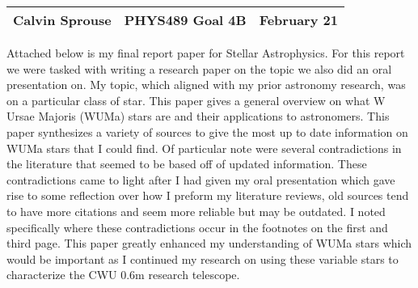 \documentclass[a4paper, 12pt]{config/homework}
\begin{document}
\noindent
\begin{tabularx}{\textwidth}{>{\centering\arraybackslash}X>{\centering\arraybackslash}X>{\centering\arraybackslash}X}
Calvin Sprouse & PHYS489 Goal 4B & 2024 February 21\\
\midrule
\end{tabularx}


Attached below is my final report paper for Stellar Astrophysics. For this report we were tasked with writing a research paper on the topic we also did an oral presentation on. My topic, which aligned with my prior astronomy research, was on a particular class of star. This paper gives a general overview on what W Ursae Majoris (WUMa) stars are and their applications to astronomers. This paper synthesizes a variety of sources to give the most up to date information on WUMa stars that I could find. Of particular note were several contradictions in the literature that seemed to be based off of updated information. These contradictions came to light after I had given my oral presentation which gave rise to some reflection over how I preform my literature reviews, old sources tend to have more citations and seem more reliable but may be outdated. I noted specifically where these contradictions occur in the footnotes on the first and third page. This paper greatly enhanced my understanding of WUMa stars which would be important as I continued my research on using these variable stars to characterize the CWU 0.6m research telescope.


\end{document}
